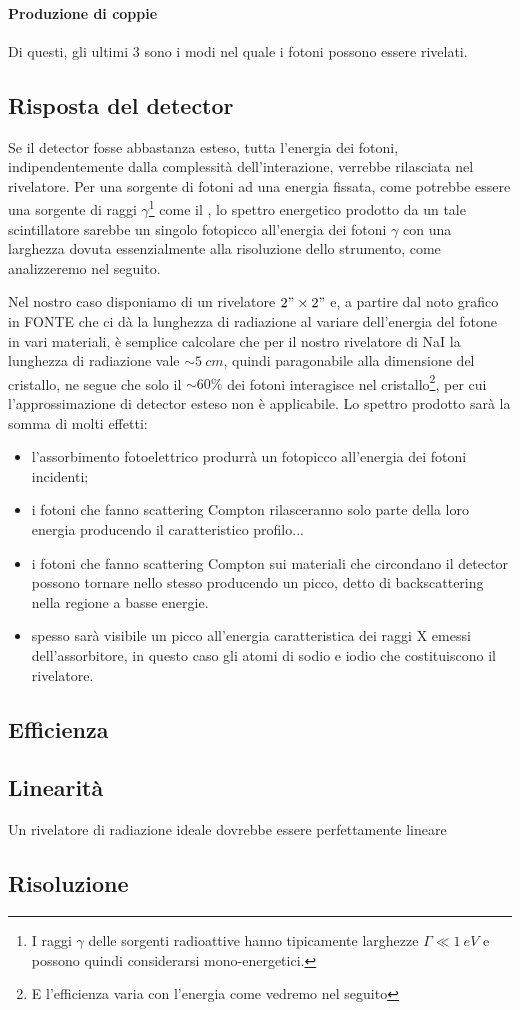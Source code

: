  \paragraph{Produzione di coppie}
 
 
 Di questi, gli ultimi 3 sono i modi nel quale i fotoni possono essere rivelati.
  
 \subsection{Risposta del detector}
 Se il detector fosse abbastanza esteso, tutta l'energia dei fotoni, indipendentemente dalla complessità dell'interazione, verrebbe rilasciata nel rivelatore. Per una sorgente di fotoni ad una energia fissata, come potrebbe essere una sorgente di raggi $\gamma$\footnote{I raggi $\gamma$ delle sorgenti radioattive hanno tipicamente larghezze $\Gamma \ll \SI{1}{eV}$ e possono quindi considerarsi mono-energetici.} come il \cs, lo spettro energetico prodotto da un tale scintillatore sarebbe un singolo fotopicco all'energia dei fotoni $\gamma$ con una larghezza dovuta essenzialmente alla risoluzione dello strumento, come analizzeremo nel seguito.
 
 Nel nostro caso disponiamo di un rivelatore $2"\times2"$ e, a partire dal noto grafico in FONTE che ci dà la lunghezza di radiazione al variare dell'energia del fotone in vari materiali, è semplice calcolare che per il nostro rivelatore di NaI la lunghezza di radiazione vale $\sim \SI{5}{cm}$, quindi paragonabile alla dimensione del cristallo, ne segue che solo il $\sim 60\%$ dei fotoni interagisce nel cristallo\footnote{E l'efficienza varia con l'energia come vedremo nel seguito}, per cui l'approssimazione di detector esteso non è applicabile.
 Lo spettro prodotto sarà la somma di molti effetti:
 \begin{itemize}
 	\item l'assorbimento fotoelettrico produrrà un fotopicco all'energia dei fotoni incidenti;
 	\item i fotoni che fanno scattering Compton rilasceranno solo parte della loro energia producendo il caratteristico profilo...
 	\item i fotoni che fanno scattering Compton sui materiali che circondano il detector possono tornare nello stesso producendo un picco, detto di backscattering nella regione a basse energie.
 	\item spesso sarà visibile un picco all'energia caratteristica dei raggi X emessi dell'assorbitore, in questo caso gli atomi di sodio e iodio che costituiscono il rivelatore. 
 \end{itemize}
  
 
 \subsection{Efficienza}
 
 \subsection{Linearità}
 Un rivelatore di radiazione ideale dovrebbe essere perfettamente lineare 
 \subsection{Risoluzione}
 
 
 
 
 